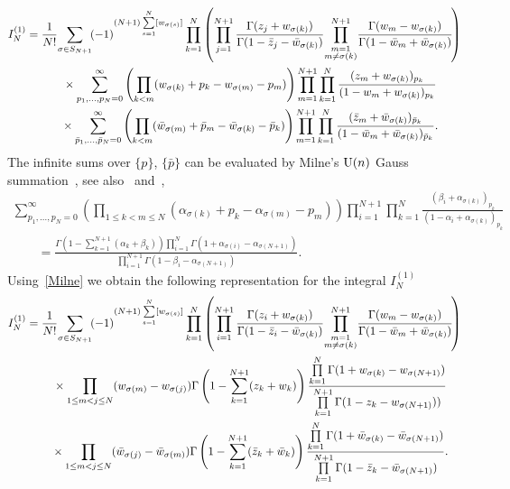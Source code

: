 \begin{gather*}
I_N^{(1)}
=\frac1{N!}\!\sum_{\sigma\in S_{N+1}}\! (-1)^{(N+1)\sum\limits_{s=1}^N
[w_{\sigma(s)}]}\prod_{k=1}^{N}\left(
\prod_{j=1}^{N+1}\frac{\Gamma(z_j+w_{\sigma(k)})}{\Gamma(1-\bar z_j-\bar w_{\sigma(k)})}
\!\prod_{\substack{m=1\\ m\neq \sigma(k)}}^{N+1}\!
 \frac{ \Gamma(w_m-w_{\sigma(k)})}{\Gamma(1-\bar w_m+\bar w_{\sigma(k)})}\!\right)
\\
\hphantom{I_N^{(1)} =}{}
\times
\sum_{p_1,\ldots,p_N= 0}^\infty
 \left(\prod_{k<m} (w_{\sigma(k)}+p_k-w_{\sigma(m)}-p_m)\right)\prod_{m=1}^{N+1} \prod_{k=1}^{N}
\frac{(z_m+w_{\sigma(k)})_{p_k}}{(1-w_m+w_{\sigma(k)})_{p_k}}
\notag\\
\hphantom{I_N^{(1)} =}{}
\times
\sum_{\bar p_1,\ldots,\bar p_N=0}^\infty
 \left(\prod_{k<m} (\bar w_{\sigma(m)}+\bar p_m-\bar w_{\sigma(k)}-\bar p_k)\right)
\prod_{m=1}^{N+1} \prod_{k=1}^{N}
\frac{(\bar z_m+\bar w_{\sigma(k)})_{\bar p_k}}{(1-\bar w_m+\bar w_{\sigma(k)})_{\bar p_k}} .
\end{gather*}
The infinite sums over $\{ p\}$, $\{\bar p\}$ can be evaluated by Milne's ${\rm U}(n)$ Gauss
summation~\cite{MILNE198859}, see also~\cite[equation~(5.8)]{Gustafson94} and~\cite{Schlosser},
\begin{gather}
\sum_{p_1,\ldots,p_N = 0}^\infty \left(\prod_{1\leq k<m\leq N} (\alpha_{\sigma(k)}+p_k-\alpha_{\sigma(m)}-p_m)\right)
\prod_{i=1}^{N+1} \prod_{k=1}^{N}\frac{(\beta_i+\alpha_{\sigma(k)})_{p_k}}{(1-\alpha_i+\alpha_{\sigma(k)})_{p_k}}\nonumber\\
 \qquad{}=\frac{\Gamma\left(1-\sum\limits_{k=1}^{N+1}(\alpha_k+\beta_k)\right)
\prod\limits_{i=1}^{N}\Gamma(1+\alpha_{\sigma(i)}-\alpha_{\sigma(N+1)})}
{\prod\limits_{i=1}^{N+1}\Gamma(1-\beta_i-\alpha_{\sigma(N+1)})}.\label{Milne}
\end{gather}
Using~\eqref{Milne} we obtain the following representation for the integral $I_N^{(1)}$
\begin{gather*}
I_N^{(1)} =\frac1{N!}\!\sum_{\sigma\in S_{N+1}} \!(-1)^{(N+1)\sum\limits_{s=1}^N
[w_{\sigma(s)}] }\prod_{k=1}^{N}\left(
\prod_{i=1}^{N+1}\frac{\Gamma(z_i+w_{\sigma(k)})}{\Gamma(1-\bar z_i-\bar w_{\sigma(k)})}
\!\prod_{\substack{m=1\\ m\neq \sigma(k)}}^{N+1}\!
 \frac{ \Gamma(w_m-w_{\sigma(k)})}{\Gamma(1-\bar w_m+\bar w_{\sigma(k)})}\!\right)\\
\hphantom{I_N^{(1)} =}{} \times
\prod_{1\leq m<j\leq N} (w_{\sigma(m)}-w_{\sigma(j)})
\Gamma\left(1-\sum_{k=1}^{N+1}(z_k+w_k)\right)
\frac{\prod\limits_{k=1}^{N}\Gamma(1+w_{\sigma(k)}-w_{\sigma(N+1)})}
{\prod\limits_{k=1}^{N+1} \Gamma(1-z_k-w_{\sigma(N+1)}))}\\
\hphantom{I_N^{(1)} =}{} \times \prod_{1\leq m<j\leq N}
(\bar w_{\sigma(j)}-\bar w_{\sigma(m)})
\Gamma\left(1-\sum_{k=1}^{N+1}(\bar z_k+\bar w_k)\right)
\frac{\prod\limits_{k=1}^{N}
\Gamma(1+\bar w_{\sigma(k)}-\bar w_{\sigma(N+1)})}{
\prod\limits_{k=1}^{N+1}
\Gamma(1-\bar z_k-\bar w_{\sigma(N+1)})}.
\end{gather*}
